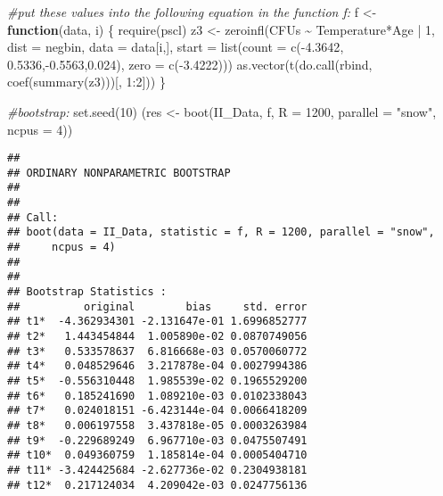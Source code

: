 \documentclass[
]{article}
\newenvironment{Shaded}{\begin{snugshade}}{\end{snugshade}}
\newcommand{\AttributeTok}[1]{\textcolor[rgb]{0.77,0.63,0.00}{#1}}
\newcommand{\CommentTok}[1]{\textcolor[rgb]{0.56,0.35,0.01}{\textit{#1}}}
\newcommand{\ControlFlowTok}[1]{\textcolor[rgb]{0.13,0.29,0.53}{\textbf{#1}}}
\newcommand{\DecValTok}[1]{\textcolor[rgb]{0.00,0.00,0.81}{#1}}
\newcommand{\FloatTok}[1]{\textcolor[rgb]{0.00,0.00,0.81}{#1}}
\newcommand{\FunctionTok}[1]{\textcolor[rgb]{0.00,0.00,0.00}{#1}}
\newcommand{\NormalTok}[1]{#1}
\newcommand{\OtherTok}[1]{\textcolor[rgb]{0.56,0.35,0.01}{#1}}
\newcommand{\SpecialCharTok}[1]{\textcolor[rgb]{0.00,0.00,0.00}{#1}}
\newcommand{\StringTok}[1]{\textcolor[rgb]{0.31,0.60,0.02}{#1}}
\begin{document}
\begin{Shaded}
\begin{Highlighting}[]
\CommentTok{\#put these values into the following equation in the function f:}
\NormalTok{f }\OtherTok{\textless{}{-}} \ControlFlowTok{function}\NormalTok{(data, i) \{}
  \FunctionTok{require}\NormalTok{(pscl)}
\NormalTok{  z3 }\OtherTok{\textless{}{-}} \FunctionTok{zeroinfl}\NormalTok{(CFUs }\SpecialCharTok{\textasciitilde{}}\NormalTok{ Temperature}\SpecialCharTok{*}\NormalTok{Age }\SpecialCharTok{|} \DecValTok{1}\NormalTok{,}
                 \AttributeTok{dist =} \StringTok{\textquotesingle{}negbin\textquotesingle{}}\NormalTok{,}
                 \AttributeTok{data =}\NormalTok{ data[i,],}
                 \AttributeTok{start =} \FunctionTok{list}\NormalTok{(}\AttributeTok{count =} \FunctionTok{c}\NormalTok{(}\SpecialCharTok{{-}}\FloatTok{4.3642}\NormalTok{, }\FloatTok{0.5336}\NormalTok{,}\SpecialCharTok{{-}}\FloatTok{0.5563}\NormalTok{,}\FloatTok{0.024}\NormalTok{), }
                              \AttributeTok{zero =} \FunctionTok{c}\NormalTok{(}\SpecialCharTok{{-}}\FloatTok{3.4222}\NormalTok{)))}
  \FunctionTok{as.vector}\NormalTok{(}\FunctionTok{t}\NormalTok{(}\FunctionTok{do.call}\NormalTok{(rbind, }\FunctionTok{coef}\NormalTok{(}\FunctionTok{summary}\NormalTok{(z3)))[, }\DecValTok{1}\SpecialCharTok{:}\DecValTok{2}\NormalTok{]))}
\NormalTok{\}}

\CommentTok{\#bootstrap:}
\FunctionTok{set.seed}\NormalTok{(}\DecValTok{10}\NormalTok{)}
\NormalTok{(res }\OtherTok{\textless{}{-}} \FunctionTok{boot}\NormalTok{(II\_Data, f, }\AttributeTok{R =} \DecValTok{1200}\NormalTok{, }\AttributeTok{parallel =} \StringTok{"snow"}\NormalTok{, }\AttributeTok{ncpus =} \DecValTok{4}\NormalTok{))}
\end{Highlighting}
\end{Shaded}

\begin{verbatim}
## 
## ORDINARY NONPARAMETRIC BOOTSTRAP
## 
## 
## Call:
## boot(data = II_Data, statistic = f, R = 1200, parallel = "snow", 
##     ncpus = 4)
## 
## 
## Bootstrap Statistics :
##          original        bias     std. error
## t1*  -4.362934301 -2.131647e-01 1.6996852777
## t2*   1.443454844  1.005890e-02 0.0870749056
## t3*   0.533578637  6.816668e-03 0.0570060772
## t4*   0.048529646  3.217878e-04 0.0027994386
## t5*  -0.556310448  1.985539e-02 0.1965529200
## t6*   0.185241690  1.089210e-03 0.0102338043
## t7*   0.024018151 -6.423144e-04 0.0066418209
## t8*   0.006197558  3.437818e-05 0.0003263984
## t9*  -0.229689249  6.967710e-03 0.0475507491
## t10*  0.049360759  1.185814e-04 0.0005404710
## t11* -3.424425684 -2.627736e-02 0.2304938181
## t12*  0.217124034  4.209042e-03 0.0247756136
\end{verbatim}
\end{document}
